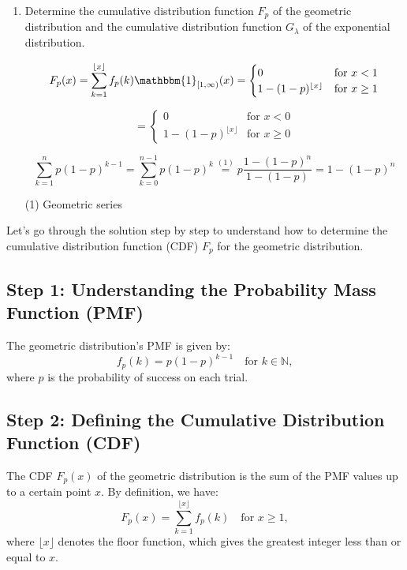 \documentclass[12pt]{article}
\begin{document}
\begin{enumerate}
    \item Determine the cumulative distribution function $F_{p}$ of the geometric distribution and the cumulative distribution function $G_{\lambda}$ of the exponential distribution.
    
    \[
    F_p(x)=\sum_{k=1}^{\lfloor x \rfloor} f_p(k) \mathbbm{1}_{[1, \infty)}(x)= 
    \begin{cases}
        0 & \text{for } x<1\\
        1-(1-p)^{\lfloor x \rfloor} & \text{for } x \geq 1
    \end{cases} 
    \]

    \[
    = 
    \begin{cases}
        0 & \text{for } x<0\\
        1-(1-p)^{\lfloor x \rfloor} & \text{for } x \geq 0
    \end{cases}
    \]


    \[
    \sum _{k=1}^n p(1-p)^{k-1} = \sum _{k=0}^{n-1} p(1-p)^{k} \stackrel{(1)}{=} p \frac{1-(1-p)^n}{1-(1-p)} = 1-(1-p)^n 
    \]

(1) Geometric series

\end{enumerate}



\newpage

Let's go through the solution step by step to understand how to determine the cumulative distribution function (CDF) \( F_{p} \) for the geometric distribution.

\subsection*{Step 1: Understanding the Probability Mass Function (PMF)}

The geometric distribution's PMF is given by:
\[
f_{p}(k) = p(1-p)^{k-1} \quad \text{for } k \in \mathbb{N},
\]
where \( p \) is the probability of success on each trial.

\subsection*{Step 2: Defining the Cumulative Distribution Function (CDF)}

The CDF \( F_{p}(x) \) of the geometric distribution is the sum of the PMF values up to a certain point \( x \). By definition, we have:
\[
F_p(x) = \sum_{k=1}^{\lfloor x \rfloor} f_p(k) \quad \text{for } x \geq 1,
\]
where \( \lfloor x \rfloor \) denotes the floor function, which gives the greatest integer less than or equal to \( x \).
\end{document}
